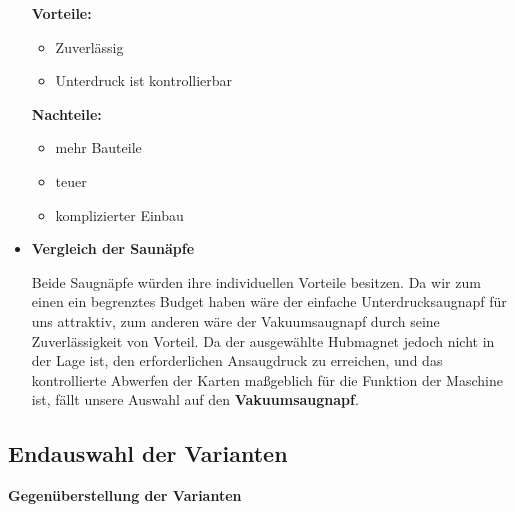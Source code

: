 \begin{itemize}
    \textbf{Vorteile:}
    \begin{itemize}
        \item Zuverlässig
        \item Unterdruck ist kontrollierbar
    \end{itemize}
    \textbf{Nachteile:}
    \begin{itemize}
        \item mehr Bauteile
        \item teuer
        \item komplizierter Einbau
    \end{itemize}
    \pagebreak
    \item \textbf{Vergleich der Saunäpfe}


    Beide Saugnäpfe würden ihre individuellen Vorteile besitzen. Da wir zum einen ein begrenztes Budget haben wäre der einfache Unterdrucksaugnapf für uns attraktiv, zum anderen wäre der Vakuumsaugnapf durch seine Zuverlässigkeit von Vorteil.
    Da der ausgewählte Hubmagnet jedoch nicht in der Lage ist, den erforderlichen Ansaugdruck zu erreichen, und das kontrollierte Abwerfen der Karten maßgeblich für die Funktion der Maschine ist, fällt unsere Auswahl auf den \textbf{Vakuumsaugnapf}.
\end{itemize}

\subsection{Endauswahl der Varianten}

\textbf{\large{Gegenüberstellung der Varianten}}

